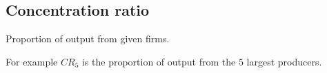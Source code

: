 
\subsection{Concentration ratio}

Proportion of output from given firms.

For example \(CR_5\) is the proportion of output from the \(5\) largest producers.

